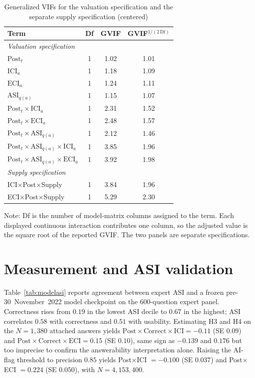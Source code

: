 \begin{table}[t]
\centering
\caption{Generalized VIFs for the valuation specification and the separate supply specification (centered)}
\label{tab:vif}
\scriptsize
\begin{tabular}{lccc}
\toprule
Term & Df & GVIF & GVIF$^{1/(2\,\mathrm{Df})}$ \\
\midrule
\multicolumn{4}{l}{\textit{Valuation specification}} \\
$\mathrm{Post}_t$ & 1 & 1.02 & 1.01 \\
$\mathrm{ICI}_a$ & 1 & 1.18 & 1.09 \\
$\mathrm{ECI}_a$ & 1 & 1.24 & 1.11 \\
$\mathrm{ASI}_{q(a)}$ & 1 & 1.15 & 1.07 \\
$\mathrm{Post}_t\times\mathrm{ICI}_a$ & 1 & 2.31 & 1.52 \\
$\mathrm{Post}_t\times\mathrm{ECI}_a$ & 1 & 2.48 & 1.57 \\
$\mathrm{Post}_t\times\mathrm{ASI}_{q(a)}$ & 1 & 2.12 & 1.46 \\
$\mathrm{Post}_t\times\mathrm{ASI}_{q(a)}\times\mathrm{ICI}_a$ & 1 & 3.85 & 1.96 \\
$\mathrm{Post}_t\times\mathrm{ASI}_{q(a)}\times\mathrm{ECI}_a$ & 1 & 3.92 & 1.98 \\
\midrule
\multicolumn{4}{l}{\textit{Supply specification}} \\
ICI$\times$Post$\times$Supply & 1 & 3.84 & 1.96 \\
ECI$\times$Post$\times$Supply & 1 & 5.29 & 2.30 \\
\bottomrule
\end{tabular}
\par\smallskip
{\scriptsize Note: Df is the number of model-matrix columns assigned to
the term. Each displayed continuous interaction contributes one
column, so the adjusted value is the square root of the reported GVIF.
The two panels are separate specifications.}
\end{table}

\section{Measurement and ASI validation}
\label{app:measurement_ext}

Table~\ref{tab:modelasi} reports agreement between expert ASI and a frozen pre-30~November~2022 model checkpoint on the 600-question expert panel. Correctness rises from $0.19$ in the lowest ASI decile to $0.67$ in the highest; ASI correlates $0.58$ with correctness and $0.51$ with usability. Estimating H3 and H4 on the $N=1{,}380$ attached answers yields $\mathrm{Post}\times\mathrm{Correct}\times\mathrm{ICI}=-0.11$ (SE $0.09$) and $\mathrm{Post}\times\mathrm{Correct}\times\mathrm{ECI}=0.15$ (SE $0.10$), same sign as $-0.139$ and $0.176$ but too imprecise to confirm the answerability interpretation alone. Raising the AI-flag threshold to precision $0.85$ yields Post$\times$ICI $=-0.100$ (SE $0.037$) and Post$\times$ECI $=0.224$ (SE $0.050$), with $N=4{,}153{,}400$.

